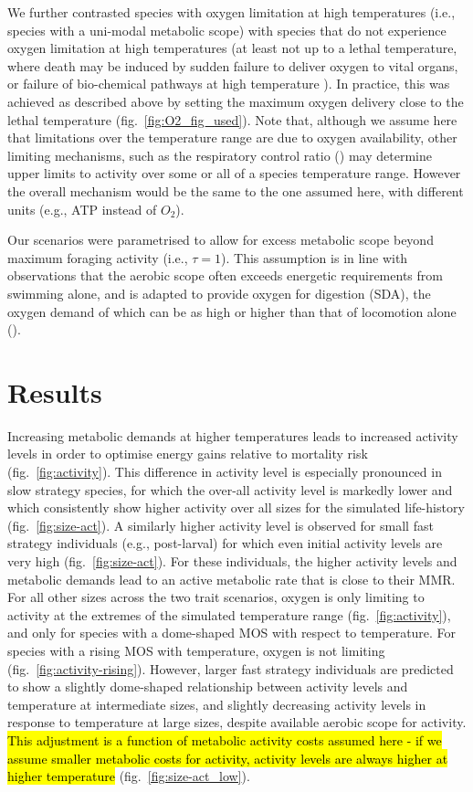 \documentclass[11pt]{article}\usepackage[]{graphicx}\usepackage[]{color,soul}
\begin{document}
We further contrasted species with oxygen limitation at high temperatures (i.e., species with a uni-modal metabolic scope) with species that do not experience oxygen limitation at high temperatures (at least not up to a lethal temperature, where death may be induced by sudden failure to deliver oxygen to vital organs, or failure of bio-chemical pathways at high temperature \citealt{salin_inadequate_2016,iftikar_mitochondria_2013}). In practice, this was achieved as described above by setting the maximum oxygen delivery close to the lethal temperature (fig.~\ref{fig:O2_fig_used}). Note that, although we assume here that limitations over the temperature range are due to oxygen availability, other limiting mechanisms, such as the respiratory control ratio (\citealt{salin_inadequate_2016,iftikar_mitochondria_2013}) may determine upper limits to activity over some or all of a species temperature range. However the overall mechanism would be the same to the one assumed here, with different units (e.g., ATP instead of $O_2$).

Our scenarios were parametrised to allow for excess metabolic scope beyond maximum foraging activity (i.e., $\tau=1$). This assumption is in line with observations that the aerobic scope often exceeds energetic requirements from swimming alone, and is adapted to provide oxygen for digestion (SDA), the oxygen demand of which can be as high or higher than that of locomotion alone (\citealt{priede_metabolic_1985}).

\section*{Results}

Increasing metabolic demands at higher temperatures leads to increased activity levels in order to optimise energy gains relative to mortality risk (fig.~\ref{fig:activity}). This difference in activity level is especially pronounced in slow strategy species, for which the over-all activity level is markedly lower and which consistently show higher activity over all sizes for the simulated life-history (fig.~\ref{fig:size-act}). A similarly higher activity level is observed for small fast strategy individuals (e.g., post-larval) for which even initial activity levels are very high (fig.~\ref{fig:size-act}). For these individuals, the higher activity levels and metabolic demands lead to an active metabolic rate that is close to their MMR. For all other sizes across the two trait scenarios, oxygen is only limiting to activity at the extremes of the simulated temperature range (fig.~\ref{fig:activity}), and only for species with a dome-shaped MOS with respect to temperature. For species with a rising MOS with temperature, oxygen is not limiting (fig.~\ref{fig:activity-rising}). However, larger fast strategy individuals are predicted to show a slightly dome-shaped relationship between activity levels and temperature at intermediate sizes, and slightly decreasing activity levels in response to temperature at large sizes, despite available aerobic scope for activity. \hl{This adjustment is a function of metabolic activity costs assumed here - if we assume smaller metabolic costs for activity, activity levels are always higher at higher temperature} (fig.~\ref{fig:size-act_low}).
\end{document}
